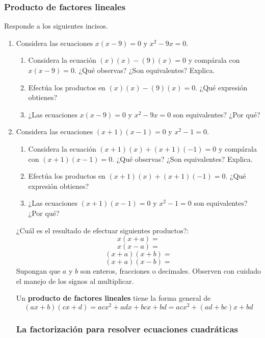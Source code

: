 \documentclass[11pt]{book}
\begin{document}
\subsubsection{Producto de factores lineales}
Responde a los siguientes incisos.
\begin{enumerate}
  \item Considera las ecuaciones $x(x - 9) = 0$ y $x^2 - 9x = 0$.
        \begin{enumerate}
          \item Considera la ecuación $(x)(x) - (9)(x) = 0$ y compárala con $x(x - 9) = 0$. ¿Qué observas? ¿Son equivalentes? Explica.
          \item Efectúa los productos en $(x)(x) - (9)(x) = 0$. ¿Qué expresión obtienes?
          \item ¿Las ecuaciones $x(x - 9) = 0$ y $x^2 - 9x = 0$ son equivalentes? ¿Por qué?
        \end{enumerate}
  \item Considera las ecuaciones $(x + 1)(x - 1) = 0$ y $x^2 - 1 = 0$.
        \begin{enumerate}
          \item Considera la ecuación $(x + 1)(x) + (x + 1)(-1) = 0$ y compárala con
                $(x + 1)(x - 1) = 0$. ¿Qué observas? ¿Son equivalentes? Explica.
          \item Efectúa los productos en $(x + 1)(x) + (x + 1)(-1) = 0$. ¿Qué expresión obtienes?
          \item ¿Las ecuaciones $(x + 1)(x - 1) = 0$ y $x^2 - 1 = 0$ son equivalentes? ¿Por qué?
        \end{enumerate}

        ¿Cuál es el resultado de efectuar siguientes productos?:
        \[x(x + a)=\]
        \[x(x - a)=\]
        \[(x + a)(x + b)=\]
        \[(x + a)(x - b)=\]
        Supongan que $a$ y $b$ son enteros, fracciones o decimales. Observen con cuidado el manejo de
        los signos al multiplicar.

        \begin{boxH}
          Un \textbf{producto de factores lineales} tiene la forma general de
          \[(ax + b)(cx + d) = acx^2 + adx + bcx + bd = acx^2 + (ad + bc)x + bd\]
        \end{boxH}

        \subsubsection{La factorización para resolver ecuaciones cuadráticas}


\end{enumerate}
\end{document}
